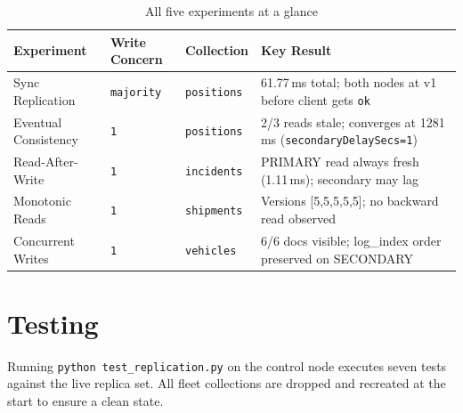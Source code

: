 \documentclass[12pt,a4paper]{article}
\newcommand{\code}[1]{\texttt{\small #1}}
\begin{document}
\begin{table}[H]
  \centering
  \caption{All five experiments at a glance}
  \label{tab:summary}
  \small
  \begin{tabularx}{\textwidth}{lllX}
    \toprule
    Experiment & Write Concern & Collection & Key Result \\
    \midrule
    Sync Replication     & \code{majority} & \code{positions}  & 61.77\,ms total; both nodes at v1 before client gets \code{ok} \\
    Eventual Consistency & \code{1}        & \code{positions}  & 2/3 reads stale; converges at 1281\,ms (\code{secondaryDelaySecs=1}) \\
    Read-After-Write     & \code{1}        & \code{incidents}  & PRIMARY read always fresh (1.11\,ms); secondary may lag \\
    Monotonic Reads      & \code{1}        & \code{shipments}  & Versions [5,5,5,5,5]; no backward read observed \\
    Concurrent Writes    & \code{1}        & \code{vehicles}   & 6/6 docs visible; log\_index order preserved on SECONDARY \\
    \bottomrule
  \end{tabularx}
\end{table}

\section{Testing}

Running \code{python test\_replication.py} on the control node executes seven tests
against the live replica set. All fleet collections are dropped and recreated at the
start to ensure a clean state.
\end{document}
